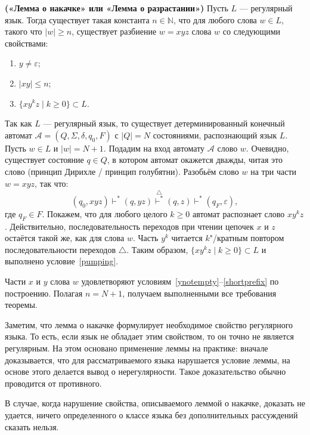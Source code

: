 \begin{mytheorem}
\label{theorem-PumpingLemma}
\textup{\textbf{(«Лемма о накачке» или «Лемма о разрастании»)}}
Пусть $L$ — регулярный язык.
Тогда существует такая константа $n\in \mathbb N$, что для любого слова $w \in L$,
такого что $|w|\geqslant n$, существует разбиение $w=xyz$ слова $w$ со следующими свойствами:
\begin{enumerate}
  \item\label{ynotempty} $y \neq \varepsilon$;
  \item\label{shortprefix} $|xy| \leqslant n$;
  \item\label{pumping} $\{ xy^kz \mid k \geqslant 0\} \subset L$.
\end{enumerate}
\end{mytheorem}
\begin{myproof}
Так как $L$ --- регулярный язык, то существует детерминированный конечный автомат
$\mathcal A=(Q, \Sigma, \delta, q_0, F)$ с $|Q|=N$ состояниями, распознающий
язык $L$. Пусть $w \in L$ и $|w|=N+1$. Подадим на вход автомату $\mathcal A$
слово $w$. Очевидно, существует состояние $q \in Q$, в котором автомат окажется
дважды, читая это слово (принцип Дирихле / принцип голубятни). Разобьём слово
$w$ на три части $w=xyz$, так что:
\[
    (q_0, xyz) \vdash^*  (q, yz) \stackrel{\bigtriangleup}{\vdash^*} (q, z)
    \vdash^* (q_F, \varepsilon),
\]
где $q_F \in F$. Покажем, что для любого целого $k \geqslant 0$ автомат
распознает слово $xy^kz$. Действительно, последовательность переходов при чтении
цепочек $x$ и $z$ остаётся такой же, как для слова $w$. Часть $y^k$ читается
$k$"/кратным повтором последовательности переходов $\bigtriangleup$. Таким
образом, $\{ xy^kz \mid k \geqslant 0\} \subset L$ и выполнено
условие~\ref{pumping}.

Части $x$ и $y$ слова $w$ удовлетворяют
условиям~\ref{ynotempty}–\ref{shortprefix} по построению. Полагая
$n=N+1$, получаем выполненными все требования теоремы.
\end{myproof}

Заметим, что лемма о накачке формулирует необходимое свойство регулярного языка. То есть, если язык не обладает этим свойством, то он точно не является регулярным. На этом основано применение леммы на практике: вначале доказывается, что для рассматриваемого языка нарушается условие леммы, на основе этого делается вывод о нерегулярности. Такое доказательство обычно проводится от противного.

В случае, когда нарушение свойства, описываемого леммой о накачке, доказать не удается, ничего определенного о классе языка без дополнительных рассуждений сказать нельзя.

